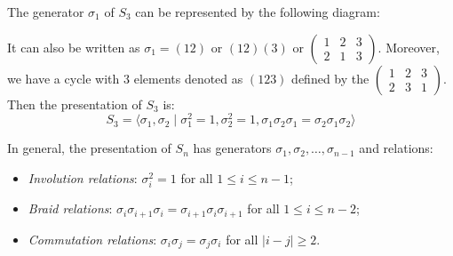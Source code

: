 \begin{example}
  The generator $\sigma_1$ of $S_3$ can be represented by the following diagram:
  \begin{center}
  \end{center}
  It can also be written as $\sigma_1 = (12)$ or $(12)(3)$ or $\begin{pmatrix} 1 & 2 & 3 \\ 2 & 1 & 3 \end{pmatrix}$. Moreover, we have a cycle with 3 elements denoted as $(123)$ defined by the $\begin{pmatrix} 1 & 2 & 3 \\ 2 & 3 & 1 \end{pmatrix}$. Then the presentation of $S_3$ is:
  \[
    S_3 = \langle \sigma_1, \sigma_2 \mid \sigma_1^2 = 1, \sigma_2^2 = 1, \sigma_1 \sigma_2 \sigma_1 = \sigma_2 \sigma_1 \sigma_2 \rangle
  \]
\end{example}

In general, the presentation of $S_n$ has generators $\sigma_1, \sigma_2, \ldots, \sigma_{n-1}$ and relations:
\begin{itemize}
  \item \emph{Involution relations}: $\sigma_i^2 = 1$ for all $1 \leq i \leq n - 1$;
  \item \emph{Braid relations}: $\sigma_i \sigma_{i+1} \sigma_i = \sigma_{i+1} \sigma_i \sigma_{i+1}$ for all $1 \leq i \leq n - 2$;
  \item \emph{Commutation relations}: $\sigma_i \sigma_j = \sigma_j \sigma_i$ for all $|i - j| \geq 2$.
\end{itemize}

